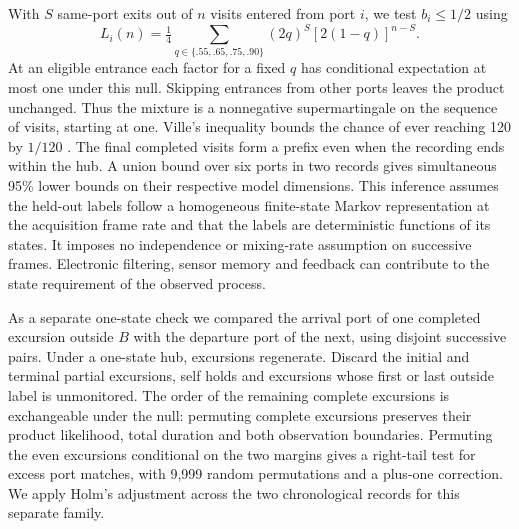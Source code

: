 With \(S\) same-port exits out of \(n\) visits entered from port \(i\), we test \(b_i\le1/2\) using
\[
 L_i(n)=\tfrac14\sum_{q\in\{.55,.65,.75,.90\}}(2q)^S[2(1-q)]^{n-S}.
\]
At an eligible entrance each factor for a fixed \(q\) has conditional expectation at most one under this null. Skipping entrances from other ports leaves the product unchanged. Thus the mixture is a nonnegative supermartingale on the sequence of visits, starting at one. Ville's inequality bounds the chance of ever reaching 120 by \(1/120\) \cite{howard}. The final completed visits form a prefix even when the recording ends within the hub. A union bound over six ports in two records gives simultaneous 95\% lower bounds on their respective model dimensions. This inference assumes the held-out labels follow a homogeneous finite-state Markov representation at the acquisition frame rate and that the labels are deterministic functions of its states. It imposes no independence or mixing-rate assumption on successive frames. Electronic filtering, sensor memory and feedback can contribute to the state requirement of the observed process.

As a separate one-state check we compared the arrival port of one completed excursion outside \(B\) with the departure port of the next, using disjoint successive pairs. Under a one-state hub, excursions regenerate. Discard the initial and terminal partial excursions, self holds and excursions whose first or last outside label is unmonitored. The order of the remaining complete excursions is exchangeable under the null: permuting complete excursions preserves their product likelihood, total duration and both observation boundaries. Permuting the even excursions conditional on the two margins gives a right-tail test for excess port matches, with 9,999 random permutations and a plus-one correction. We apply Holm's adjustment across the two chronological records for this separate family.


